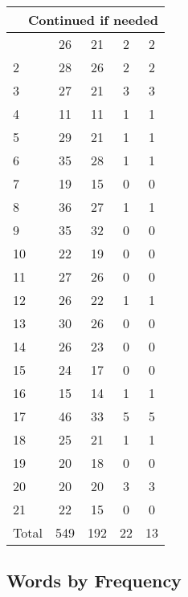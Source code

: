 \begin{center}
\begin{longtable}{l|c|c|c|c}
\hline \multicolumn{5}{|r|}{{Continued if needed}} \\ \hline
\endfoot 
1 & 26 & 21 & 2 & 2\\ \hline
2 & 28 & 26 & 2 & 2\\ \hline
3 & 27 & 21 & 3 & 3\\ \hline
4 & 11 & 11 & 1 & 1\\ \hline
5 & 29 & 21 & 1 & 1\\ \hline
6 & 35 & 28 & 1 & 1\\ \hline
7 & 19 & 15 & 0 & 0\\ \hline
8 & 36 & 27 & 1 & 1\\ \hline
9 & 35 & 32 & 0 & 0\\ \hline
10 & 22 & 19 & 0 & 0\\ \hline
11 & 27 & 26 & 0 & 0\\ \hline
12 & 26 & 22 & 1 & 1\\ \hline
13 & 30 & 26 & 0 & 0\\ \hline
14 & 26 & 23 & 0 & 0\\ \hline
15 & 24 & 17 & 0 & 0\\ \hline
16 & 15 & 14 & 1 & 1\\ \hline
17 & 46 & 33 & 5 & 5\\ \hline
18 & 25 & 21 & 1 & 1\\ \hline
19 & 20 & 18 & 0 & 0\\ \hline
20 & 20 & 20 & 3 & 3\\ \hline
21 & 22 & 15 & 0 & 0\\ \hline
\hline \hline
Total & 549 & 192 & 22 & 13



\end{longtable}
\end{center}

 
\subsection{Words by Frequency}

